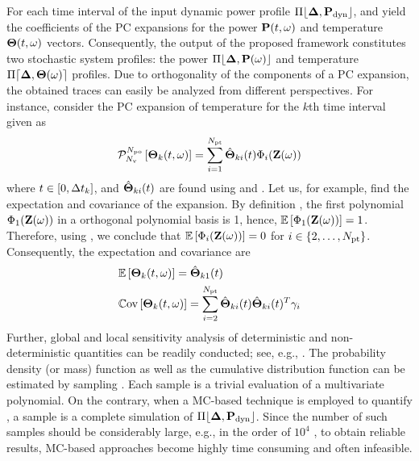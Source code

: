 For each time interval of the input dynamic power profile $\profPdyn$,  and  yield the coefficients of the PC expansions for the power $\mathbf{P}(t, \omega)$ and temperature ${\boldsymbol\Theta}(t, \omega)$ vectors. Consequently, the output of the proposed framework constitutes two stochastic system profiles: the power $\profP{\o}$ and temperature $\profT{\o}$ profiles. Due to orthogonality of the components of a PC expansion, the obtained traces can easily be analyzed from different perspectives. For instance, consider the PC expansion of temperature for the $k$th time interval given as
\begin{equation} \elabel{pc-k}
  \oPC{\vars}{\pcorder}{\vTO_k(\t, \o)} = \sum_{i = 1}^{\pcterms} \pcc{\vTO}_{ki}(\t) \pcb_i(\vZ(\o))
\end{equation}
where $t \in [0, \Delta t_k]$, and $\hat{{\boldsymbol\Theta}}_{ki}(t)$ are found using  and . Let us, for example, find the expectation and covariance of the expansion. By definition \cite{xiu2010}, the first polynomial $\Phi_1(\mathbf{Z}(\omega))$ in a orthogonal polynomial basis is 1, hence, $\mathbb{E}\left[\Phi_1(\mathbf{Z}(\omega))\right] = 1$. Therefore, using , we conclude that $\mathbb{E}\left[\Phi_i(\mathbf{Z}(\omega))\right] = 0$ for $i \in \{ 2, \dotsc, {N_\text{pt}} \}$. Consequently, the expectation and covariance are
\begin{align*}
  & \mathbb{E}\left[{\boldsymbol\Theta}_k(t, \omega)\right] = \hat{{\boldsymbol\Theta}}_{k1}(t) \\
  & \mathbb{C}\text{ov}\left[{\boldsymbol\Theta}_k(t, \omega)\right] = \sum_{i = 2}^{{N_\text{pt}}} \hat{{\boldsymbol\Theta}}_{ki}(t) \hat{{\boldsymbol\Theta}}_{ki}(t)^T \gamma_i
\end{align*}
Further, global and local sensitivity analysis of deterministic and non-deterministic quantities can be readily conducted; see, e.g., \cite{eldred2009, maitre2010}. The probability density (or mass) function as well as the cumulative distribution function can be estimated by sampling . Each sample is a trivial evaluation of a multivariate polynomial. On the contrary, when a MC-based technique is employed to quantify , a sample is a complete simulation of $\profPdyn$. Since the number of such samples should be considerably large, e.g., in the order of $10^4$ \cite{xiu2010}, to obtain reliable results, MC-based approaches become highly time consuming and often infeasible.

